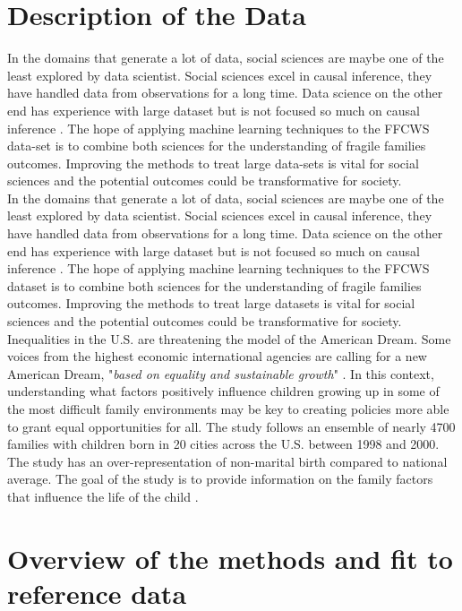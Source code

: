 \section{Description of the Data}
In the domains that generate a lot of data, social sciences are maybe one of the least explored by data scientist. Social sciences excel in causal inference, they have handled data from observations for a long time. Data science on the other end has experience with large dataset but is not focused so much on causal inference \cite{grimmer2015we}. The hope of applying machine learning techniques to the FFCWS data-set is to combine both sciences for the understanding of fragile families outcomes. Improving the methods to treat large data-sets is vital for social sciences and the potential outcomes could be transformative for society.\\
In the domains that generate a lot of data, social sciences are maybe one of the least explored by data scientist. Social sciences excel in causal inference, they have handled data from observations for a long time. Data science on the other end has experience with large dataset but is not focused so much on causal inference \cite{grimmer2015we}. The hope of applying machine learning techniques to the FFCWS dataset is to combine both sciences for the understanding of fragile families outcomes. Improving the methods to treat large datasets is vital for social sciences and the potential outcomes could be transformative for society.\\
Inequalities in the U.S. are threatening the model of the American Dream. Some voices from the highest economic international agencies are calling for a new American Dream, "\textit{based on equality and sustainable growth}" \cite{wef2017}. In this context, understanding what factors positively influence children growing up in some of the most difficult family environments may be key to creating policies more able to grant equal opportunities for all. The study follows an ensemble of nearly 4700 families with children born in 20 cities across the U.S. between 1998 and 2000. The study has an over-representation of non-marital birth compared to national average. The goal of the study is to provide information on the family factors that influence the life of the child  \cite{reichman2001fragile}.
\section{Overview of the methods and fit to reference data}
